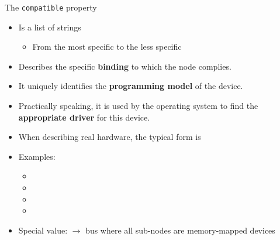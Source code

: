 \begin{frame}{The {\tt compatible} property}
  \begin{itemize}
  \item Is a list of strings
    \begin{itemize}
    \item From the most specific to the less specific
    \end{itemize}
  \item Describes the specific {\bf binding} to which the node complies.
  \item It uniquely identifies the {\bf programming model} of the
    device.
  \item Practically speaking, it is used by the operating system to
    find the {\bf appropriate driver} for this device.
  \item When describing real hardware, the typical form is
  \item Examples:
    \begin{itemize}
    \item {}
    \item {}
    \item {}
    \item {}
    \end{itemize}
  \item Special value:  $\rightarrow$ bus where all
    sub-nodes are memory-mapped devices
  \end{itemize}
\end{frame}

